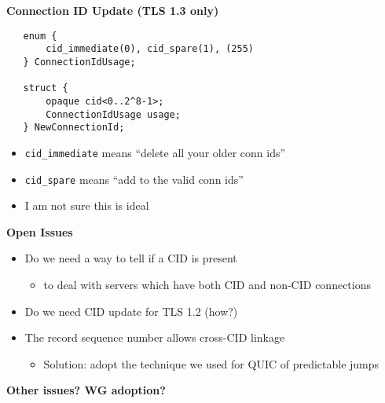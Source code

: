 \documentclass[helvetica]{seminar}
\newcommand{\heading}[1]{%
  \begin{center} 
    \large\bf 
    #1 
  \end{center} 
  \vspace{.4 in}}
\begin{document}
\begin{slide}
  \heading{Connection ID Update (TLS 1.3 only)}

\begin{verbatim}
   enum {
       cid_immediate(0), cid_spare(1), (255)
   } ConnectionIdUsage;

   struct {
       opaque cid<0..2^8-1>;
       ConnectionIdUsage usage;
   } NewConnectionId;
\end{verbatim}

  \begin{itemize}
    \item \verb^cid_immediate^ means ``delete all your older conn ids''
    \item \verb^cid_spare^ means ``add to the valid conn ids''
    \item I am not sure this is ideal
  \end{itemize}

\end{slide}



\begin{slide}
  \heading{Open Issues}

  \begin{itemize}
  \item Do we need a way to tell if a CID is present
    \begin{itemize}
    \item to deal with servers which have both CID and non-CID connections
    \end{itemize}
  \item Do we need CID update for TLS 1.2 (how?)
  \item The record sequence number allows cross-CID linkage
    \begin{itemize}
    \item Solution: adopt the technique we used for QUIC of predictable jumps
    \end{itemize}
  \end{itemize}
\end{slide}


\begin{slide}
\heading{Other issues? WG adoption?}

\end{slide}
\end{document}
